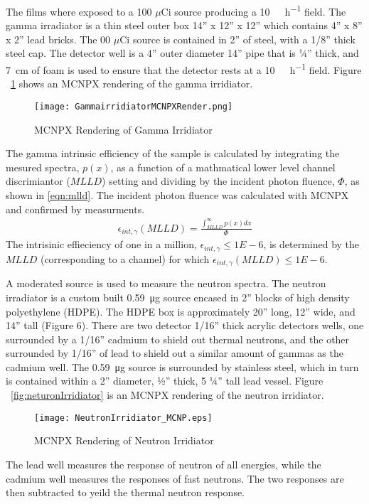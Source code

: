 \documentclass[draftcls,onecolumn]{IEEEtran}
\begin{document}
 The films where exposed to a 100 $\mu$Ci  source producing a \SI{10}{\milli\roetgen\per\hour} field. 
The gamma irradiator is a thin steel outer box 14” x 12” x 12” which contains 4” x 8” x 2” lead bricks.  
The 00 $\mu$Ci  source is contained in 2” of steel, with a 1/8” thick steel cap.  
The detector well is a 4” outer diameter 14” pipe that is ¼” thick, and \SI{7}{\cm} of foam is used to ensure that the detector rests at a \SI{10}{\milli\roetgen\per\hour} field. 
Figure ~\ref{fig:gammaIrridiator} shows an MCNPX rendering of the gamma irridiator.
\begin{figure}
	\centering
	\texttt{[image: GammairridiatorMCNPXRender.png]}
	\caption{MCNPX Rendering of Gamma Irridiator}
	\label{fig:gammaIrridiator}
\end{figure}
The gamma intrinsic efficiency of the sample is calculated by integrating the mesured spectra, $p(x)$, as a function of a mathmatical lower level channel discrimiantor ($MLLD$) setting and dividing by the incident photon fluence, $\Phi$, as shown in \eqref{eqn:mlld}.
The incident photon fluence was calculated with MCNPX and confirmed by measurments.
\begin{align}
	\label{eqn:mlld}
	\epsilon_{int,\gamma} \left(MLLD\right) = \frac{\int_{MLLD}^\infty p(x)dx}{\Phi} 
\end{align}
The intrisinic effieciency of one in a million, $\epsilon_{int,\gamma} \le \si{1E-6}$, is determined by the $MLLD$ (corresponding to a channel) for which $\epsilon_{int,\gamma} \left(MLLD\right) \le \si{1E-6}$.

A moderated  source is used to measure the neutron spectra.
The neutron irradiator is a custom built \SI{0.59}{\ug} source encased in 2” blocks of high density polyethylene (HDPE).
The HDPE box is approximately 20” long, 12” wide, and 14” tall (Figure 6).
There are two detector 1/16” thick acrylic detectors wells, one surrounded by a 1/16” cadmium to shield out thermal neutrons, and the other surrounded by 1/16” of lead to shield out a similar amount of gammas as the cadmium well.
The \SI{0.59}{\ug} source is surrounded by stainless steel, which in turn is contained within a 2” diameter, ½” thick, 5 ¼” tall lead vessel. 
Figure ~\ref{fig:neturonIrridiator} is an MCNPX rendering of the neutron irridiator.
\begin{figure}
	\centering
	\texttt{[image: NeutronIrridiator\_MCNP.eps]}
	\caption{MCNPX Rendering of Neutron Irridiator}
	\label{fig:neutronIrridiator}
\end{figure}
The lead well measures the response of neutron of all energies, while the cadmium well measures the responses of fast neutrons.
The two responses are then subtracted to yeild the thermal neutron response.
\end{document}
